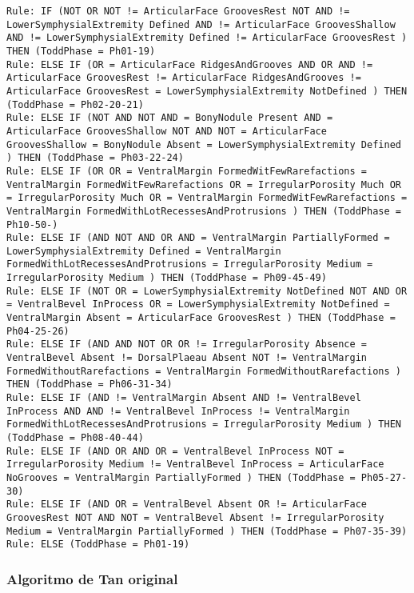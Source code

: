 \begin{lstlisting}
Rule: IF (NOT OR NOT != ArticularFace GroovesRest NOT AND != LowerSymphysialExtremity Defined AND != ArticularFace GroovesShallow AND != LowerSymphysialExtremity Defined != ArticularFace GroovesRest ) THEN (ToddPhase = Ph01-19)
Rule: ELSE IF (OR = ArticularFace RidgesAndGrooves AND OR AND != ArticularFace GroovesRest != ArticularFace RidgesAndGrooves != ArticularFace GroovesRest = LowerSymphysialExtremity NotDefined ) THEN (ToddPhase = Ph02-20-21)
Rule: ELSE IF (NOT AND NOT AND = BonyNodule Present AND = ArticularFace GroovesShallow NOT AND NOT = ArticularFace GroovesShallow = BonyNodule Absent = LowerSymphysialExtremity Defined ) THEN (ToddPhase = Ph03-22-24)
Rule: ELSE IF (OR OR = VentralMargin FormedWitFewRarefactions = VentralMargin FormedWitFewRarefactions OR = IrregularPorosity Much OR = IrregularPorosity Much OR = VentralMargin FormedWitFewRarefactions = VentralMargin FormedWithLotRecessesAndProtrusions ) THEN (ToddPhase = Ph10-50-)
Rule: ELSE IF (AND NOT AND OR AND = VentralMargin PartiallyFormed = LowerSymphysialExtremity Defined = VentralMargin FormedWithLotRecessesAndProtrusions = IrregularPorosity Medium = IrregularPorosity Medium ) THEN (ToddPhase = Ph09-45-49)
Rule: ELSE IF (NOT OR = LowerSymphysialExtremity NotDefined NOT AND OR = VentralBevel InProcess OR = LowerSymphysialExtremity NotDefined = VentralMargin Absent = ArticularFace GroovesRest ) THEN (ToddPhase = Ph04-25-26)
Rule: ELSE IF (AND AND NOT OR OR != IrregularPorosity Absence = VentralBevel Absent != DorsalPlaeau Absent NOT != VentralMargin FormedWithoutRarefactions = VentralMargin FormedWithoutRarefactions ) THEN (ToddPhase = Ph06-31-34)
Rule: ELSE IF (AND != VentralMargin Absent AND != VentralBevel InProcess AND AND != VentralBevel InProcess != VentralMargin FormedWithLotRecessesAndProtrusions = IrregularPorosity Medium ) THEN (ToddPhase = Ph08-40-44)
Rule: ELSE IF (AND OR AND OR = VentralBevel InProcess NOT = IrregularPorosity Medium != VentralBevel InProcess = ArticularFace NoGrooves = VentralMargin PartiallyFormed ) THEN (ToddPhase = Ph05-27-30)
Rule: ELSE IF (AND OR = VentralBevel Absent OR != ArticularFace GroovesRest NOT AND NOT = VentralBevel Absent != IrregularPorosity Medium = VentralMargin PartiallyFormed ) THEN (ToddPhase = Ph07-35-39)
Rule: ELSE (ToddPhase = Ph01-19)
\end{lstlisting}

\newpage

\subsubsection{Algoritmo de Tan original}

